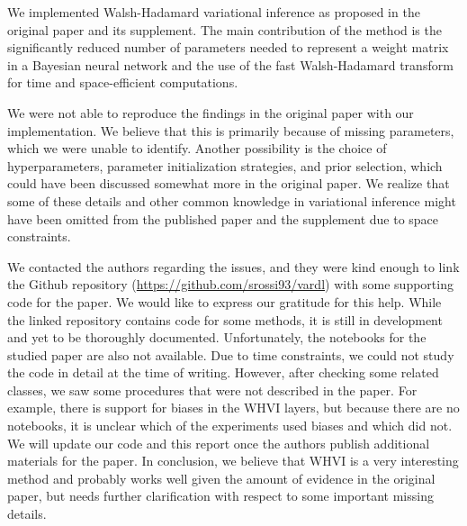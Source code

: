 We implemented Walsh-Hadamard variational inference as proposed in the original paper and its supplement.
The main contribution of the method is the significantly reduced number of parameters needed to represent a weight matrix in a Bayesian neural network and the use of the fast Walsh-Hadamard transform for time and space-efficient computations.

We were not able to reproduce the findings in the original paper with our implementation.
We believe that this is primarily because of missing parameters, which we were unable to identify.
Another possibility is the choice of hyperparameters, parameter initialization strategies, and prior selection, which could have been discussed somewhat more in the original paper.
We realize that some of these details and other common knowledge in variational inference might have been omitted from the published paper and the supplement due to space constraints.

We contacted the authors regarding the issues, and they were kind enough to link the Github repository (\url{https://github.com/srossi93/vardl}) with some supporting code for the paper.
We would like to express our gratitude for this help.
While the linked repository contains code for some methods, it is still in development and yet to be thoroughly documented.
Unfortunately, the notebooks for the studied paper are also not available.
Due to time constraints, we could not study the code in detail at the time of writing.
However, after checking some related classes, we saw some procedures that were not described in the paper.
For example, there is support for biases in the WHVI layers, but because there are no notebooks, it is unclear which of the experiments used biases and which did not.
We will update our code and this report once the authors publish additional materials for the paper.
In conclusion, we believe that WHVI is a very interesting method and probably works well given the amount of evidence in the original paper, but needs further clarification with respect to some important missing details.
